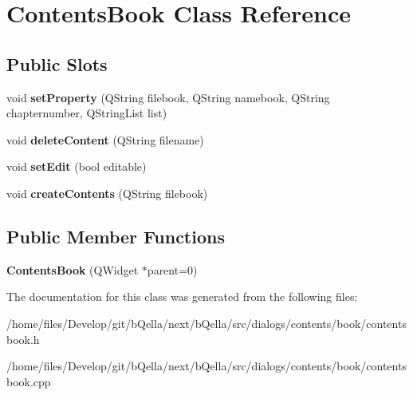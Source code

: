 \hypertarget{classContentsBook}{
\section{ContentsBook Class Reference}
\label{classContentsBook}
}
\subsection*{Public Slots}
\begin{DoxyCompactItemize}
\item 
\hypertarget{classContentsBook_afbfb72bbe8d106de87dd17d073525e33}{
void {\bfseries setProperty} (QString filebook, QString namebook, QString chapternumber, QStringList list)}
\label{classContentsBook_afbfb72bbe8d106de87dd17d073525e33}

\item 
\hypertarget{classContentsBook_ad60c76be80f298abe7be774fe82c0e1b}{
void {\bfseries deleteContent} (QString filename)}
\label{classContentsBook_ad60c76be80f298abe7be774fe82c0e1b}

\item 
\hypertarget{classContentsBook_a85f473fa5a80dc441921076f4e096b1d}{
void {\bfseries setEdit} (bool editable)}
\label{classContentsBook_a85f473fa5a80dc441921076f4e096b1d}

\item 
\hypertarget{classContentsBook_a5f81c8e94bcdfca3a0549d71f1d1d452}{
void {\bfseries createContents} (QString filebook)}
\label{classContentsBook_a5f81c8e94bcdfca3a0549d71f1d1d452}

\end{DoxyCompactItemize}
\subsection*{Public Member Functions}
\begin{DoxyCompactItemize}
\item 
\hypertarget{classContentsBook_a5f25e67d7d1f925b87059e6704e511e1}{
{\bfseries ContentsBook} (QWidget $\ast$parent=0)}
\label{classContentsBook_a5f25e67d7d1f925b87059e6704e511e1}

\end{DoxyCompactItemize}


The documentation for this class was generated from the following files:\begin{DoxyCompactItemize}
\item 
/home/files/Develop/git/bQella/next/bQella/src/dialogs/contents/book/contentsbook.h\item 
/home/files/Develop/git/bQella/next/bQella/src/dialogs/contents/book/contentsbook.cpp\end{DoxyCompactItemize}
